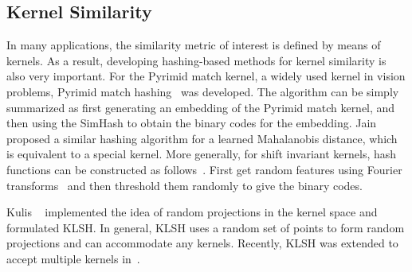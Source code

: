 
\subsection{Kernel Similarity}

In many applications, the similarity metric of interest is defined by means of kernels. As a result, developing hashing-based methods for kernel similarity is also very important. For the Pyrimid match kernel, a widely used kernel in vision problems, Pyrimid match hashing~\cite{grauman2007cvpr} was developed. The algorithm can be simply summarized as first generating an embedding of the Pyrimid match kernel, and then using the \mbox{SimHash} to obtain the binary codes for the embedding. Jain \etal~\cite{jain2008cvpr} proposed a similar hashing algorithm for a learned \mbox{Mahalanobis} distance, which is equivalent to a special kernel. More generally, for shift invariant kernels, hash functions can be constructed as follows~\cite{raginsky2009nips}. First get random features using Fourier transforms~\cite{rahimi2007nips} and then threshold them randomly to give the binary codes.

Kulis \etal~\cite{kulis2009iccv} implemented the idea of random projections in the kernel space and formulated \mbox{KLSH}. In general, \mbox{KLSH} uses a random set of points to form random projections and can accommodate any kernels. Recently, \mbox{KLSH} was extended to accept multiple kernels in~\cite{zhang2011mm}.



